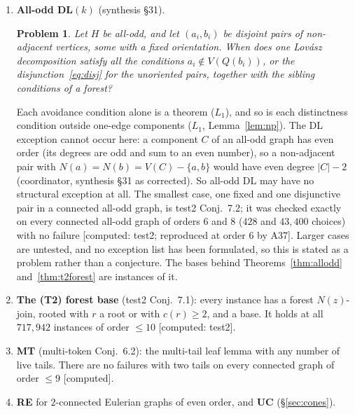 \documentclass[11pt]{amsart}
\newtheorem{problem}[theorem]{Problem}
\theoremstyle{definition}
\newcommand{\st}[1]{\textsf{\small[#1]}}
\begin{document}
\begin{enumerate}[leftmargin=*]
There is no failure in the $12{,}312$ graphs of order $\le9$ \st{computed}. For $k=1$ the induction stops
exactly at L1Blocked.
\item \textbf{All-odd DL$(k)$} (synthesis \S31).
\begin{problem}\label{prob:allodd}
Let $H$ be all-odd, and let $(a_i,b_i)$ be disjoint pairs of non-adjacent vertices, some with a fixed
orientation. When does one Lov\'asz decomposition satisfy all the conditions $a_i\notin V(Q(b_i))$, or
the disjunction~\eqref{eq:disj} for the unoriented pairs, together with the sibling conditions of a
forest?
\end{problem}
Each avoidance condition alone is a theorem ($L_1$), and so is each distinctness condition outside
one-edge components ($L_1$, Lemma~\ref{lem:np}). The DL exception cannot occur here: a component $C$ of
an all-odd graph has even order (its degrees are odd and sum to an even number), so a non-adjacent pair
with $N(a)=N(b)=V(C)-\{a,b\}$ would have even degree $|C|-2$ (coordinator, synthesis \S31 as
corrected). So all-odd DL may have no structural exception at all. The smallest case, one fixed and
one disjunctive pair in a connected all-odd graph, is test2 Conj.~7.2; it was checked exactly on every
connected all-odd graph of orders $6$ and $8$ ($428$ and $43{,}400$ choices) with no failure
\st{computed: test2; reproduced at order 6 by A37}. Larger cases are untested, and no exception list
has been formulated, so this is stated as a problem rather than a conjecture. The bases behind
Theorems~\ref{thm:allodd} and~\ref{thm:t2forest} are instances of it.
\item \textbf{The (T2) forest base} (test2 Conj.~7.1): every instance has a forest $N(z)$-join, rooted with
$r$ a root or with $c(r)\ge2$, and a base. It holds at all $717{,}942$ instances of order $\le10$
\st{computed: test2}.
\item \textbf{MT} (multi-token Conj.~6.2): the multi-tail leaf lemma with any number of live tails. There
are no failures with two tails on every connected graph of order $\le9$ \st{computed}.
\item \textbf{RE} for $2$-connected Eulerian graphs of even order, and \textbf{UC} (\S\ref{sec:cones}).
\end{enumerate}
\end{document}
